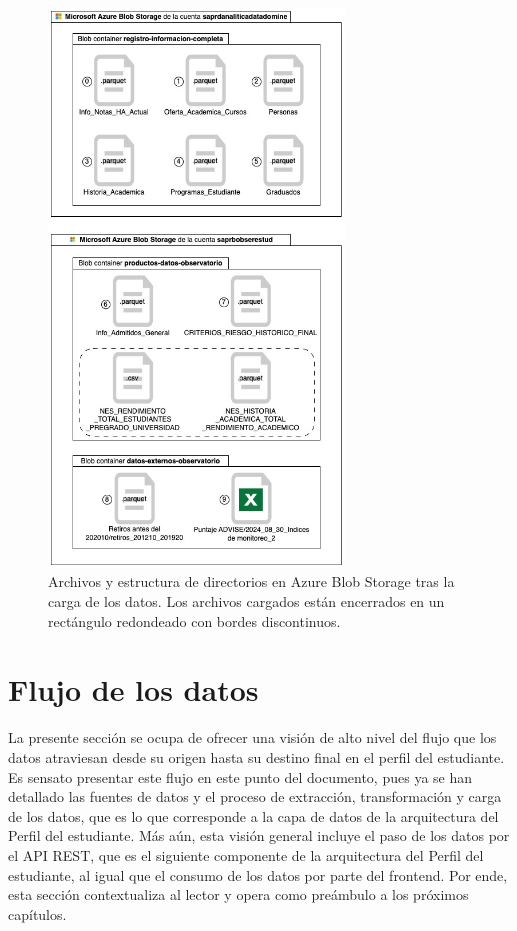 \begin{figure}[h]
	\centering
	\includegraphics[width=0.7\textwidth]{img/blob_storage_post.jpg}
	\caption{Archivos y estructura de directorios en Azure Blob Storage tras la carga de los datos. Los archivos cargados están encerrados en un rectángulo redondeado con bordes discontinuos.}
	\label{fig:blob_storage_post}
\end{figure}

\section{Flujo de los datos}

La presente sección se ocupa de ofrecer una visión de alto nivel del flujo que los datos atraviesan desde su origen hasta su destino final en el perfil del estudiante. Es sensato presentar este flujo en este punto del documento, pues ya se han detallado las fuentes de datos y el proceso de extracción, transformación y carga de los datos, que es lo que corresponde a la capa de datos de la arquitectura del Perfil del estudiante. Más aún, esta visión general incluye el paso de los datos por el API REST, que es el siguiente componente de la arquitectura del Perfil del estudiante, al igual que el consumo de los datos por parte del frontend. Por ende, esta sección contextualiza al lector y opera como preámbulo a los próximos capítulos.
